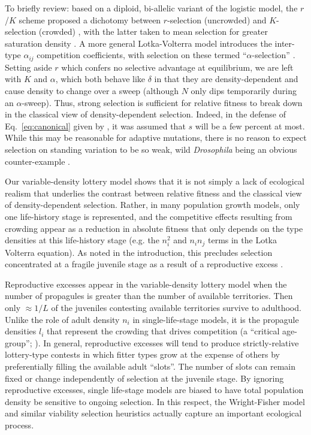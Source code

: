 \documentclass[12pt]{article}
\begin{document}
To briefly review: based on a diploid, bi-allelic variant of the logistic model, the $r$/$K$ scheme proposed a dichotomy between $r$-selection (uncrowded) and $K$-selection (crowded) \citep{macarthur_1962}, with the latter taken to mean selection for greater saturation density \citep{gill_1974}. A more general Lotka-Volterra model introduces the inter-type $\alpha_{ij}$ competition coefficients, with selection on these termed ``$\alpha$-selection'' \citep{gill_1974,joshi_2001}. Setting aside $r$ which confers no selective advantage at equilibrium, we are left with $K$ and $\alpha$, which both behave like $\delta$ in that they are density-dependent and cause density to change over a sweep (although $N$ only dips temporarily during an $\alpha$-sweep). Thus, strong selection is sufficient for relative fitness to break down in the classical view of density-dependent selection. Indeed, in the defense of Eq.~\eqref{eq:canonical} given by \cite{kimura1969natural}, it was assumed that $s$ will be a few percent at most. While this may be reasonable for adaptive mutations, there is no reason to expect selection on standing variation to be so weak, wild \textit{Drosophila} being an obvious counter-example \citep{bergland_14}.

Our variable-density lottery model shows that it is not simply a lack of ecological realism that underlies the contrast between relative fitness and the classical view of density-dependent selection. Rather, in many population growth models, only one life-history stage is represented, and the competitive effects resulting from crowding appear as a reduction in absolute fitness that only depends on the type densities at this life-history stage (e.g. the $n_i^2$ and $n_in_j$ terms in the Lotka Volterra equation). As noted in the introduction, this precludes selection concentrated at a fragile juvenile stage as a result of a reproductive excess \citep{chesson_1983,turner1968population,kimura1969natural,nei1971fertility}. 

Reproductive excesses appear in the variable-density lottery model when the number of propagules is greater than the number of available territories. Then only $\approx 1/L$ of the juveniles contesting available territories survive to adulthood. Unlike the role of adult density $n_i$ in single-life-stage models, it is the propagule densities $l_i$ that represent the crowding that drives competition (a ``critical age-group''; \citealt[pp. 54]{charlesworth_1994}). In general, reproductive excesses will tend to produce strictly-relative lottery-type contests in which fitter types grow at the expense of others by preferentially filling the available adult ``slots''. The number of slots can remain fixed or change independently of selection at the juvenile stage. By ignoring reproductive excesses, single life-stage models are biased to have total population density be sensitive to ongoing selection. In this respect, the Wright-Fisher model and similar viability selection heuristics actually capture an important ecological process.
\end{document}
